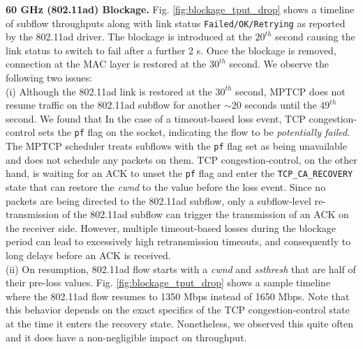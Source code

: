 \noindent\textbf{60 GHz (802.11ad) Blockage. } Fig. \ref{fig:blockage_tput_drop} shows a
timeline of subflow throughputs along with link status {\tt Failed/OK/Retrying} as reported by 
the 802.11ad driver. The blockage is introduced at the $20^{th}$ second causing the link status 
to switch to fail after a further 2 s. Once the blockage is removed, connection at the MAC layer is
restored at the $30^{th}$ second. We observe the following two issues:
\\
(i) Although the 802.11ad link is restored at the $30^{th}$ second, MPTCP does not resume traffic 
on the 802.11ad subflow for another $\sim$20 seconds until the $49^{th}$ second. We found that
In the case of a timeout-based loss event, TCP congestion-control sets the {\tt pf} flag on the socket,
indicating the flow to be \emph{potentially failed}. The MPTCP scheduler treats subflows with 
the {\tt pf} flag set as being unavailable and does not schedule any packets on them. TCP
congestion-control, on the other hand, is waiting for an ACK to unset
the {\tt pf} flag and enter the {\tt TCP\_CA\_RECOVERY} state that can
restore the \emph{cwnd} to the value before the loss event. Since no
packets are being directed to the 802.11ad subflow, only a subflow-level re-transmission 
of the 802.11ad subflow can trigger the transmission of an ACK on the receiver side. However, 
multiple timeout-based losses during the blockage period can lead to excessively 
high retransmission timeouts, and consequently to long delays before an ACK is received.
\\
(ii) On resumption, 802.11ad flow starts with a \emph{cwnd} and
\emph{ssthresh} that are half of their pre-loss values. Fig. \ref{fig:blockage_tput_drop} shows 
a sample timeline where the 802.11ad flow resumes to 1350 Mbps instead of 1650 Mbps. Note that
this behavior depends on the exact specifics of the TCP congestion-control state at the time 
it enters the recovery state. Nonetheless, we observed this quite often and it does have a
non-negligible impact on throughput.

\begin{figure*}[ht]
    \centering
    \hfill
    \hfill
    \vspace{-0.15in}
    \caption{\name}
    \vspace{-0.1in}
\end{figure*}
